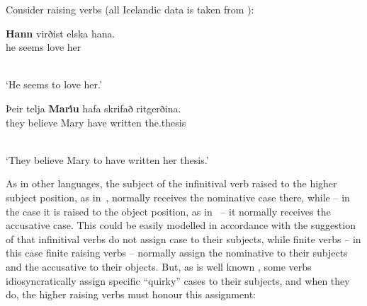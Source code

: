 \documentclass[output=paper]{langsci/langscibook}
\begin{document}
Consider  raising verbs (all Icelandic data is taken from \citealt[304–305]{SKG92}):
\begin{examples}
\item \label{isl:nom}
  \begin{examples}
  \item 
    \begin{gloss}
      \textbf{Hann} virðist elska hana. \\
      he\Nom{} seems love\Inf{} her\Acc{}
    \end{gloss}\\[\glosslen]
    `He seems to love her.'
  \item 
    \begin{gloss}
      {Þ}eir telja \textbf{Mar{\'\i}u} hafa skrifað ritgerðina. \\
      they believe Mary\Acc{} have\Inf{} written the.thesis
    \end{gloss}\\[\glosslen]
    `They believe Mary to have written her thesis.'
  \end{examples}
\end{examples}
As in other languages, the subject of the infinitival verb raised to the higher subject position, as in~, normally receives the nominative case there, while – in the case it is raised to the object position, as in~ – it normally receives the accusative case.  This could be easily modelled in accordance with the suggestion of \citet[30]{ps2} that infinitival verbs do not assign case to their subjects, while finite verbs – in this case finite raising verbs – normally assign the nominative to their subjects and the accusative to their objects.  But, as is well known \citep{Andrews82a-u-kopiert,zae:mal:83,ZMT85a}, some  verbs idiosyncratically assign specific “quirky” cases to their subjects, and when they do, the higher raising verbs must honour this assignment:
\end{document}
